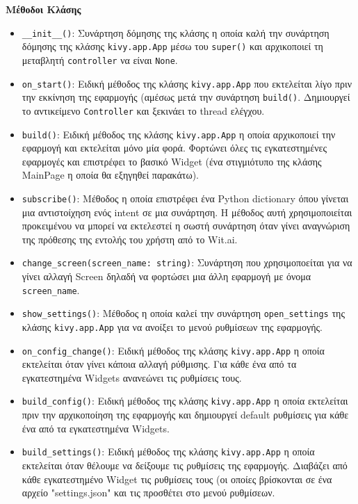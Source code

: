 \noindent\textbf{Μέθοδοι Κλάσης}
\begin{itemize}
    \item \texttt{\_\_init\_\_()}: Συνάρτηση δόμησης της κλάσης η οποία καλή την συνάρτηση δόμησης της κλάσης \texttt{kivy.app.App} μέσω του \texttt{super()} και αρχικοποιεί τη μεταβλητή \texttt{controller} να είναι \texttt{None}.
    
    \item \texttt{on\_start()}: Ειδική μέθοδος της κλάσης \texttt{kivy.app.App} που εκτελείται λίγο πριν την εκκίνηση της εφαρμογής (αμέσως μετά την συνάρτηση \texttt{build()}. Δημιουργεί το αντικείμενο \texttt{Controller} και ξεκινάει το thread ελέγχου.
    
    \item \texttt{build()}: Ειδική μέθοδος της κλάσης \texttt{kivy.app.App} η οποία αρχικοποιεί την εφαρμογή και εκτελείται μόνο μία φορά. Φορτώνει όλες τις εγκατεστημένες εφαρμογές και επιστρέφει το βασικό Widget (ένα στιγμιότυπο της κλάσης MainPage η οποία θα εξηγηθεί παρακάτω).
    
    \item \texttt{subscribe()}: Μέθοδος η οποία επιστρέφει ένα Python dictionary όπου γίνεται μια αντιστοίχηση ενός intent σε μια συνάρτηση. Η μέθοδος αυτή χρησιμοποιείται προκειμένου να μπορεί να εκτελεστεί η σωστή συνάρτηση όταν γίνει αναγνώριση της πρόθεσης της εντολής του χρήστη από το Wit.ai. 
    
    \item \texttt{change\_screen(screen\_name: string)}: Συνάρτηση που χρησιμοποείται για να γίνει αλλαγή Screen δηλαδή να φορτώσει μια άλλη εφαρμογή με όνομα \texttt{screen\_name}.
    
    \item \texttt{show\_settings()}: Μέθοδος η οποία καλεί την συνάρτηση \texttt{open\_settings} της κλάσης \texttt{kivy.app.App} για να ανοίξει το μενού ρυθμίσεων της εφαρμογής.
    
    \item \texttt{on\_config\_change()}: Ειδική μέθοδος της κλάσης \texttt{kivy.app.App} η οποία εκτελείται όταν γίνει κάποια αλλαγή ρύθμισης. Για κάθε ένα από τα εγκατεστημένα Widgets ανανεώνει τις ρυθμίσεις τους.
    
    \item \texttt{build\_config()}: Ειδική μέθοδος της κλάσης \texttt{kivy.app.App} η οποία
    εκτελείται πριν την αρχικοποίηση της εφαρμογής και δημιουργεί default ρυθμίσεις για κάθε ένα από τα εγκατεστημένα Widgets.
    
    \item \texttt{build\_settings()}: Ειδική μέθοδος της κλάσης \texttt{kivy.app.App} η οποία εκτελείται όταν θέλουμε να δείξουμε τις ρυθμίσεις της εφαρμογής. Διαβάζει από κάθε εγκατεστημένο Widget τις ρυθμίσεις τους (οι οποίες βρίσκονται σε ένα αρχείο "settings.json" και τις προσθέτει στο μενού ρυθμίσεων.
    
\end{itemize}

